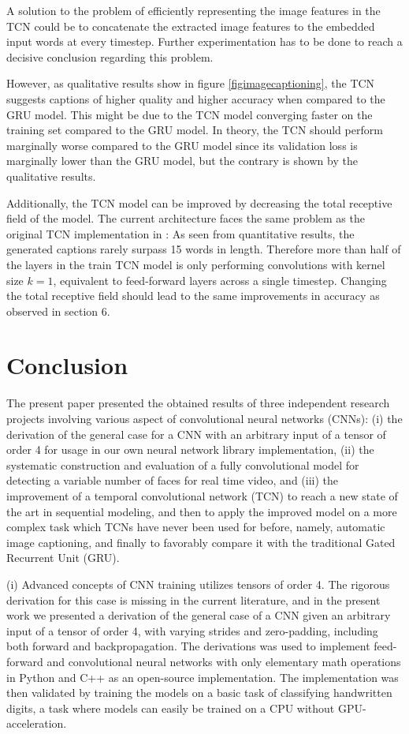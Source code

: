\documentclass[a4paper, twoside]{article}
\begin{document}
A solution to the problem of efficiently representing the image features in the TCN could be to concatenate the extracted image features to the embedded input words at every timestep. Further experimentation has to be done to reach a decisive conclusion regarding this problem.

However, as qualitative results show in figure \ref{figimagecaptioning}, the TCN suggests captions of higher quality and higher accuracy when compared to the GRU model. This might be due to the TCN model converging faster on the training set compared to the GRU model. In theory, the TCN should perform marginally worse compared to the GRU model since its validation loss is marginally lower than the GRU model, but the contrary is shown by the qualitative results.

Additionally, the TCN model can be improved by decreasing the total receptive field of the model. The current architecture faces the same problem as the original TCN implementation in \cite{tcn}: As seen from quantitative results, the generated captions rarely surpass 15 words in length. Therefore more than half of the layers in the train TCN model is only performing convolutions with kernel size $k=1$, equivalent to feed-forward layers across a single timestep. Changing the total receptive field should lead to the same improvements in accuracy as observed in section 6.

\section{Conclusion}
The present paper presented the obtained results of three independent research projects involving various aspect of convolutional neural networks (CNNs): (i) the derivation of the general case for a CNN with an arbitrary input of a tensor of order 4 for usage in our own neural network library implementation, (ii) the systematic construction and evaluation of a fully convolutional model for detecting a variable number of faces for real time video, and (iii) the improvement of a temporal convolutional network (TCN) to reach a new state of the art in sequential modeling, and then to apply the improved model on a more complex task which TCNs have never been used for before, namely, automatic image captioning, and finally to favorably compare it with the traditional Gated Recurrent Unit (GRU).

(i) Advanced concepts of CNN training utilizes tensors of order 4. The rigorous derivation for this case is missing in the current literature, and in the present work we presented a derivation of the general case of a CNN given an arbitrary input of a tensor of order 4, with varying strides and zero-padding, including both forward and backpropagation. The derivations was used to implement feed-forward and convolutional neural networks with only elementary math operations in Python and C++ as an open-source implementation. The implementation was then validated by training the models on a basic task of classifying handwritten digits, a task where models can easily be trained on a CPU without GPU-acceleration.
\end{document}
